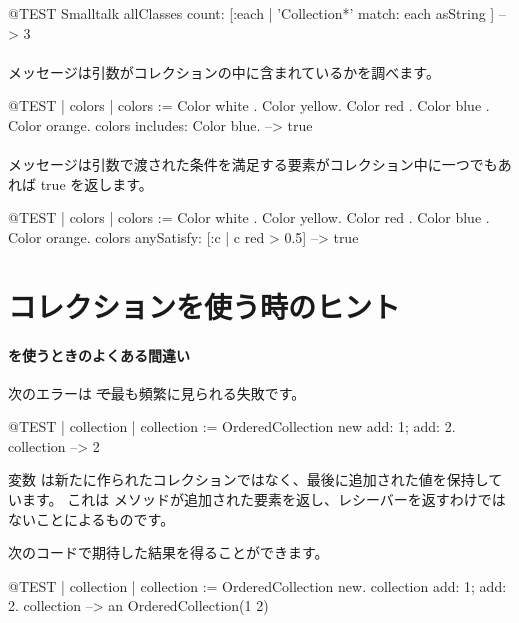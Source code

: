 \documentclass[a4paper,10pt,twoside]{book}
\begin{document}
\begin{code}{@TEST}
Smalltalk allClasses count: [:each | 'Collection*' match: each asString ] --> 3
\end{code}

\paragraph{}   メッセージは引数がコレクションの中に含まれているかを調べます。

\begin{code}{@TEST | colors |}
colors := {Color white . Color yellow. Color red . Color blue . Color orange}.
colors includes: Color blue. --> true
\end{code}

\paragraph{}   メッセージは引数で渡された条件を満足する要素がコレクション中に一つでもあれば true を返します。

\begin{code}{@TEST | colors | colors := {Color white . Color yellow. Color red . Color blue . Color orange}.}
colors anySatisfy: [:c | c red > 0.5] --> true
\end{code}
\section{コレクションを使う時のヒント}

\paragraph{ を使うときのよくある間違い} 次のエラーは \st で最も頻繁に見られる失敗です。

\begin{code}{@TEST | collection | }
collection := OrderedCollection new add: 1; add: 2.
collection --> 2
\end{code}
\noindent
変数  は新たに作られたコレクションではなく、最後に追加された値を保持しています。
これは メソッドが追加された要素を返し、レシーバーを返すわけではないことによるものです。

次のコードで期待した結果を得ることができます。
\begin{code}{@TEST | collection |}
collection := OrderedCollection new.
collection add: 1; add: 2.
collection --> an OrderedCollection(1 2)
\end{code}
\end{document}
